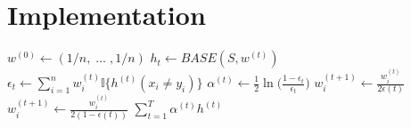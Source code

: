 	
\section{Implementation}
\begin{algorithm}[htpb]
	\label{alg:adaboost}
	\begin{algorithmic}[]
		\State $w^{(0)} \gets (1/n,\;\dots\;,1/n)$
			\State $h_{t} \gets BASE(S, w^{(t)})$
			\State $\epsilon_{t} \gets \sum_{i=1}^{n}w_{i}^{(t)}\mathbb{I}\lbrace h^{(t)}(x_{i} \neq y_{i}) \rbrace $
			\State $\alpha^{(t)} \gets \frac{1}{2}\ln\Big(\frac{1-\epsilon_{t}}{\epsilon_{t}}\Big)$
					\State $w_{i}^{(t+1)}\gets\frac{w_{i}^{(t)}}{2\epsilon{(t)}}$
				\Else
					\State $w_{i}^{(t+1)}\gets\frac{w_{i}^{(t)}}{2(1-\epsilon{(t)})}$
				\EndIf
			\EndFor
		\EndFor
		\Return $\sum_{t=1}^{T}\alpha^{(t)}h^{(t)}$
		\EndProcedure
	\end{algorithmic}
\end{algorithm}






